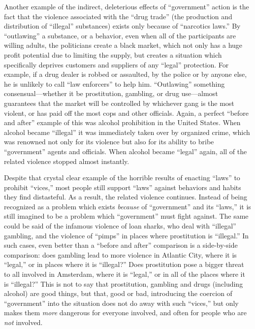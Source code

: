 \documentclass{book}
\begin{document}
Another example of the indirect, deleterious effects of \enquote{government} action is the fact that the violence associated with the \enquote{drug trade} (the production and distribution of \enquote{illegal} substances) exists only because of \enquote{narcotics laws.} By \enquote{outlawing} a substance, or a behavior, even when all of the participants are willing adults, the politicians create a black market, which not only has a huge profit potential due to limiting the supply, but creates a situation which specifically deprives customers and suppliers of any \enquote{legal} protection. For example, if a drug dealer is robbed or assaulted, by the police or by anyone else, he is unlikely to call \enquote{law enforcers} to help him. \enquote{Outlawing} something consensual---whether it be prostitution, gambling, or drug use---almost guarantees that the market will be controlled by whichever gang is the most violent, or has paid off the most cops and other officials. Again, a perfect \enquote{before and after} example of this was alcohol prohibition in the United States. When alcohol became \enquote{illegal} it was immediately taken over by organized crime, which was renowned not only for its violence but also for its ability to bribe \enquote{government} agents and officials. When alcohol became \enquote{legal} again, all of the related violence stopped almost instantly.

Despite that crystal clear example of the horrible results of enacting \enquote{laws} to prohibit \enquote{vices,} most people still support \enquote{laws} against behaviors and habits they find distasteful. As a result, the related violence continues. Instead of being recognized as a problem which exists \emph{because} of \enquote{government} and its \enquote{laws,} it is still imagined to be a problem which \enquote{government} must fight against. The same could be said of the infamous violence of loan sharks, who deal with \enquote{illegal} gambling, and the violence of \enquote{pimps} in places where prostitution is \enquote{illegal.} In such cases, even better than a \enquote{before and after} comparison is a side-by-side comparison: does gambling lead to more violence in Atlantic City, where it is \enquote{legal,} or in places where it is \enquote{illegal?} Does prostitution pose a bigger threat to all involved in Amsterdam, where it is \enquote{legal,} or in all of the places where it is \enquote{illegal?} This is not to say that prostitution, gambling and drugs (including alcohol) are good things, but that, good or bad, introducing the coercion of \enquote{government} into the situation does not do away with such \enquote{vices,} but only makes them \emph{more} dangerous for everyone involved, and often for people who are \emph{not} involved.
\end{document}
